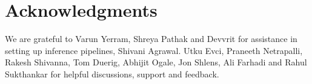 \section*{Acknowledgments}
We are grateful to Varun Yerram, Shreya Pathak and Devvrit for assistance in setting up inference pipelines, Shivani Agrawal. Utku Evci, Praneeth Netrapalli, Rakesh Shivanna, Tom Duerig, Abhijit Ogale, Jon Shlens, Ali Farhadi and Rahul Sukthankar
for helpful discussions, support and feedback.